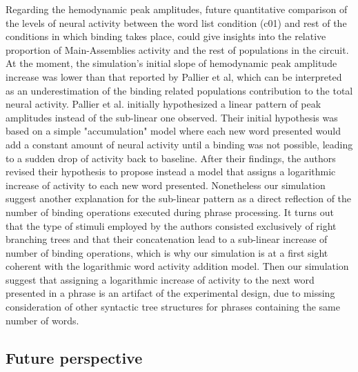 \documentclass[10pt]{article}
\begin{document}
Regarding the hemodynamic peak amplitudes, future quantitative comparison of the levels of neural activity between the word list condition (c01) and rest of the conditions in which binding takes place, could give insights into the relative proportion of Main-Assemblies activity and the rest of populations in the circuit.
At the moment, the simulation's initial slope of hemodynamic peak amplitude increase was lower than that reported by Pallier et al, which can be interpreted as an underestimation of the binding related populations contribution to the total neural activity.
Pallier et al. initially hypothesized a linear pattern of peak amplitudes instead of the sub-linear one observed.
Their initial hypothesis was based on a simple "accumulation" model where each new word presented would add a constant amount of neural activity until a binding was not possible, leading to a sudden drop of activity back to baseline.
After their findings, the authors revised their hypothesis to propose instead a model that assigns a logarithmic increase of activity to each new word presented.
Nonetheless our simulation suggest another explanation for the sub-linear pattern as a direct reflection of the number of binding operations executed during phrase processing.
It turns out that the type of stimuli employed by the authors consisted exclusively of right branching trees and that their concatenation lead to a sub-linear increase of number of binding operations, which is why our simulation is at a first sight coherent with the logarithmic word activity addition model.
Then our simulation suggest that assigning a logarithmic increase of activity to the next word presented in a phrase is an artifact of the experimental design, due to missing consideration of other syntactic tree structures for phrases containing the same number of words.


\subsection{Future perspective}
\end{document}
